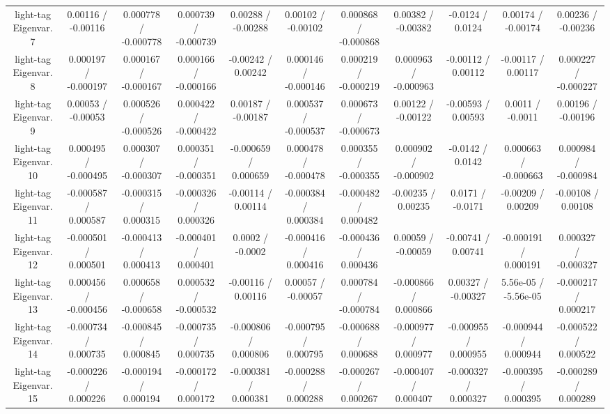 \begin{table}[htbp]
\begin{center}
\begin{tabular}{|c|c|c|c|c|c|c|c|c|c|c|}
  light-tag Eigenvar. 7 & 0.00116 / -0.00116 & 0.000778 / -0.000778 & 0.000739 / -0.000739 & 0.00288 / -0.00288 & 0.00102 / -0.00102 & 0.000868 / -0.000868 & 0.00382 / -0.00382 & -0.0124 / 0.0124 & 0.00174 / -0.00174 & 0.00236 / -0.00236 \\ 
  light-tag Eigenvar. 8 & 0.000197 / -0.000197 & 0.000167 / -0.000167 & 0.000166 / -0.000166 & -0.00242 / 0.00242 & 0.000146 / -0.000146 & 0.000219 / -0.000219 & 0.000963 / -0.000963 & -0.00112 / 0.00112 & -0.00117 / 0.00117 & 0.000227 / -0.000227 \\ 
  light-tag Eigenvar. 9 & 0.00053 / -0.00053 & 0.000526 / -0.000526 & 0.000422 / -0.000422 & 0.00187 / -0.00187 & 0.000537 / -0.000537 & 0.000673 / -0.000673 & 0.00122 / -0.00122 & -0.00593 / 0.00593 & 0.0011 / -0.0011 & 0.00196 / -0.00196 \\ 
  light-tag Eigenvar. 10 & 0.000495 / -0.000495 & 0.000307 / -0.000307 & 0.000351 / -0.000351 & -0.000659 / 0.000659 & 0.000478 / -0.000478 & 0.000355 / -0.000355 & 0.000902 / -0.000902 & -0.0142 / 0.0142 & 0.000663 / -0.000663 & 0.000984 / -0.000984 \\ 
  light-tag Eigenvar. 11 & -0.000587 / 0.000587 & -0.000315 / 0.000315 & -0.000326 / 0.000326 & -0.00114 / 0.00114 & -0.000384 / 0.000384 & -0.000482 / 0.000482 & -0.00235 / 0.00235 & 0.0171 / -0.0171 & -0.00209 / 0.00209 & -0.00108 / 0.00108 \\ 
  light-tag Eigenvar. 12 & -0.000501 / 0.000501 & -0.000413 / 0.000413 & -0.000401 / 0.000401 & 0.0002 / -0.0002 & -0.000416 / 0.000416 & -0.000436 / 0.000436 & 0.00059 / -0.00059 & -0.00741 / 0.00741 & -0.000191 / 0.000191 & 0.000327 / -0.000327 \\ 
  light-tag Eigenvar. 13 & 0.000456 / -0.000456 & 0.000658 / -0.000658 & 0.000532 / -0.000532 & -0.00116 / 0.00116 & 0.00057 / -0.00057 & 0.000784 / -0.000784 & -0.000866 / 0.000866 & 0.00327 / -0.00327 & 5.56e-05 / -5.56e-05 & -0.000217 / 0.000217 \\ 
  light-tag Eigenvar. 14 & -0.000734 / 0.000735 & -0.000845 / 0.000845 & -0.000735 / 0.000735 & -0.000806 / 0.000806 & -0.000795 / 0.000795 & -0.000688 / 0.000688 & -0.000977 / 0.000977 & -0.000955 / 0.000955 & -0.000944 / 0.000944 & -0.000522 / 0.000522 \\ 
  light-tag Eigenvar. 15 & -0.000226 / 0.000226 & -0.000194 / 0.000194 & -0.000172 / 0.000172 & -0.000381 / 0.000381 & -0.000288 / 0.000288 & -0.000267 / 0.000267 & -0.000407 / 0.000407 & -0.000327 / 0.000327 & -0.000395 / 0.000395 & -0.000289 / 0.000289 \\ 

\end{tabular}
\end{center}
\end{table}
